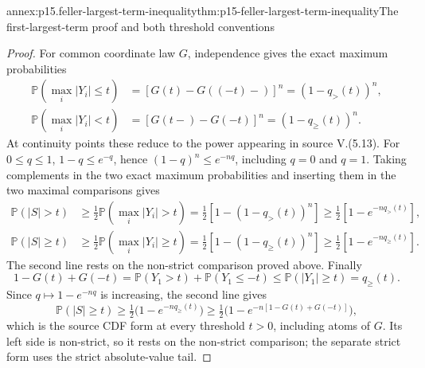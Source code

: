 \begin{annexitem}{annex:p15.feller-largest-term-inequality}{thm:p15-feller-largest-term-inequality}{The first-largest-term proof and both threshold conventions}
\begin{proof}
For common coordinate law \(G\), independence gives the exact
maximum probabilities
\[
 \begin{aligned}
 \mathbb P(\max_i|Y_i|\leq t)
   &=[G(t)-G((-t)-)]^n=(1-q_>(t))^n,\\
 \mathbb P(\max_i|Y_i|<t)
   &=[G(t-)-G(-t)]^n=(1-q_\geq(t))^n.
 \end{aligned}
\]
At continuity points these reduce to the power appearing in source
V.(5.13). For \(0\leq q\leq1\), \(1-q\leq e^{-q}\), hence
\((1-q)^n\leq e^{-nq}\), including \(q=0\) and \(q=1\).
Taking complements in the two exact maximum probabilities and
inserting them in the two maximal comparisons gives
\[
 \begin{aligned}
 \mathbb P(|S|>t)&\geq\tfrac12\mathbb P(\max_i|Y_i|>t)
   =\tfrac12[1-(1-q_>(t))^n]\geq\tfrac12[1-e^{-nq_>(t)}],\\
 \mathbb P(|S|\geq t)&\geq\tfrac12\mathbb P(\max_i|Y_i|\geq t)
   =\tfrac12[1-(1-q_\geq(t))^n]\geq\tfrac12[1-e^{-nq_\geq(t)}].
 \end{aligned}
\]
The second line rests on the non-strict comparison proved above.
Finally
\[
 1-G(t)+G(-t)
   =\mathbb P(Y_1>t)+\mathbb P(Y_1\leq-t)
   \leq\mathbb P(|Y_1|\geq t)=q_\geq(t).
\]
Since \(q\mapsto1-e^{-nq}\) is increasing, the second line gives
\[
 \mathbb P(|S|\geq t)\geq\tfrac12\bigl(1-e^{-nq_\geq(t)}\bigr)
   \geq\tfrac12\bigl(1-e^{-n[1-G(t)+G(-t)]}\bigr),
\]
which is the source CDF form at every threshold \(t>0\), including
atoms of \(G\). Its left side is non-strict, so it rests on the
non-strict comparison; the separate strict form uses the strict
absolute-value tail.
\end{proof}
\end{annexitem}

